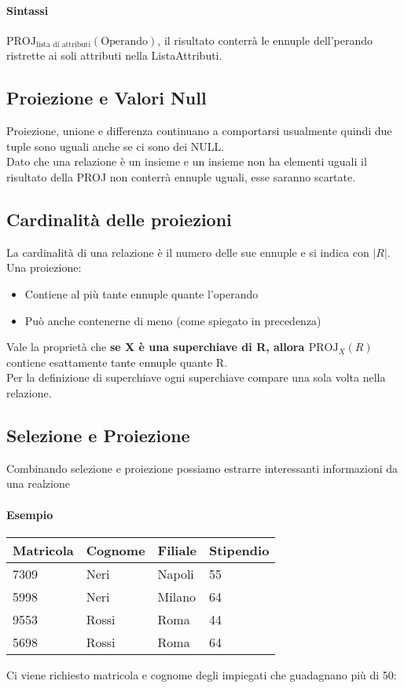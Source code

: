 \paragraph*{Sintassi} $\text{PROJ}_{\text{lista di attributi}}(\text{Operando})$, il risultato
conterrà le ennuple dell'perando ristrette ai soli attributi nella ListaAttributi.
\subsection*{Proiezione e Valori Null}
Proiezione, unione e differenza continuano a comportarsi usualmente quindi due tuple sono uguali
anche se ci sono dei NULL. \\
Dato che una relazione è un insieme e un insieme non ha elementi uguali il risultato
della PROJ non conterrà ennuple uguali, esse saranno scartate.
\subsection*{Cardinalità delle proiezioni}La cardinalità di una relazione è il numero delle sue ennuple e
si indica con $|R|$.\\
Una proiezione:
\begin{itemize}
    \item Contiene al più tante ennuple quante l'operando
    \item Può anche contenerne di meno (come spiegato in precedenza)
\end{itemize}
Vale la proprietà che \textbf{se X è una superchiave di R, allora  $\text{PROJ}_X(R)$} contiene
esattamente tante ennuple quante R.\\
Per la definizione di superchiave ogni superchiave compare una sola volta nella relazione.\\
\subsection*{Selezione e Proiezione}
Combinando selezione e proiezione possiamo estrarre interessanti informazioni da una realzione
\paragraph*{Esempio}
\begin{table}[]
    \begin{tabular}{|l|l|l|l|}
    \hline
    Matricola & Cognome & Filiale & Stipendio \\ \hline
    7309      & Neri    & Napoli  & 55        \\ \hline
    5998      & Neri    & Milano  & 64        \\ \hline
    9553      & Rossi   & Roma    & 44        \\ \hline
    5698      & Rossi   & Roma    & 64        \\ \hline
    \end{tabular}
\end{table}
Ci viene richiesto matricola e cognome degli impiegati che guadagnano più di 50:
